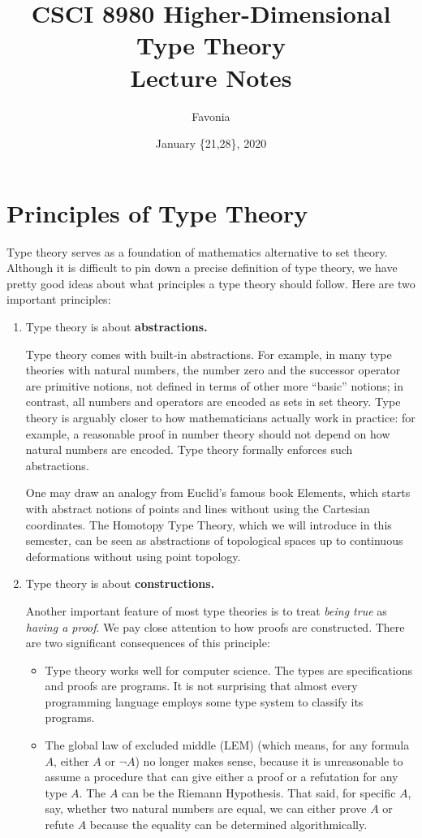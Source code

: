 \documentclass[11pt]{article}
\title{CSCI 8980 Higher-Dimensional Type Theory\\ Lecture Notes}
\author{Favonia}
\date{January \{21,28\}, 2020}
\begin{document}
\maketitle

\section{Principles of Type Theory}

Type theory serves as a foundation of mathematics alternative to set theory. Although it is difficult to pin down a precise definition of type theory, we have pretty good ideas about what principles a type theory should follow. Here are two important principles:
\begin{enumerate}
  \item Type theory is about \textbf{abstractions.}

    Type theory comes with built-in abstractions. For example, in many type theories with natural numbers, the number zero and the successor operator are primitive notions, not defined in terms of other more ``basic'' notions; in contrast, all numbers and operators are encoded as sets in set theory. Type theory is arguably closer to how mathematicians actually work in practice: for example, a reasonable proof in number theory should not depend on how natural numbers are encoded. Type theory formally enforces such abstractions.

    One may draw an analogy from Euclid's famous book Elements, which starts with abstract notions of points and lines without using the Cartesian coordinates. The Homotopy Type Theory, which we will introduce in this semester, can be seen as abstractions of topological spaces up to continuous deformations without using point topology.

  \item Type theory is about \textbf{constructions.}

    Another important feature of most type theories is to treat \emph{being true} as \emph{having a proof}. We pay close attention to how proofs are constructed. There are two significant consequences of this principle:
    \begin{itemize}
      \item Type theory works well for computer science. The types are specifications and proofs are programs. It is not surprising that almost every programming language employs some type system to classify its programs.

      \item The global law of excluded middle (LEM) (which means, for any formula $A$, either $A$ or $\neg A$) no longer makes sense, because it is unreasonable to assume a procedure that can give either a proof or a refutation for any type $A$. The $A$ can be the Riemann Hypothesis. That said, for specific $A$, say, whether two natural numbers are equal, we can either prove $A$ or refute $A$ because the equality can be determined algorithmically.
    \end{itemize}
\end{enumerate}
\end{document}
